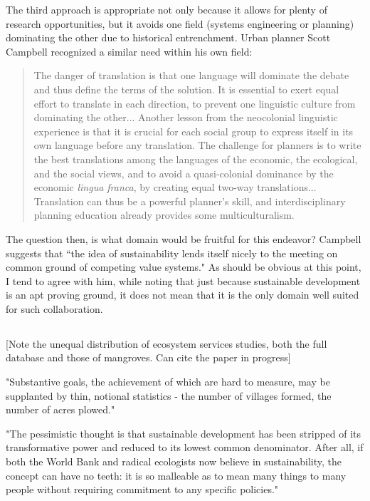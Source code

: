 The third approach is appropriate not only because it allows for plenty of research opportunities, but it avoids one field (systems engineering or planning) dominating the other due to historical entrenchment. Urban planner Scott Campbell recognized a similar need within his own field:

\blockquote{The danger of translation is that one language will dominate the debate and thus define the terms of the solution. It is essential to exert equal effort to translate in each direction, to prevent one linguistic culture from dominating the other... Another lesson from the neocolonial linguistic experience is that it is crucial for each social group to express itself in its own language before any translation. The challenge for planners is to write the best translations among the languages of the economic, the ecological, and the social views, and to avoid a quasi-colonial dominance by the economic \textit{lingua franca}, by creating equal two-way translations... Translation can thus be a powerful planner's skill, and interdisciplinary planning education already provides some multiculturalism. \cite[\textsuperscript{(p230)}]{campbellGreenCitiesGrowing2016}}

The question then, is what domain would be fruitful for this endeavor? Campbell suggests that ``the idea of sustainability lends itself nicely to the meeting on common ground of competing value systems." As should be obvious at this point, I tend to agree with him, while noting that just because sustainable development is an apt proving ground, it does not mean that it is the only domain well suited for such collaboration.

\subsection{} \label{sec:sdg_critique}

[Note the unequal distribution of ecosystem services studies, both the full database and those of mangroves. Can cite the paper in progress]

"Substantive goals, the achievement of which are hard to measure, may be supplanted by thin, notional statistics - the number of villages formed, the number of acres plowed." \cite{scottSeeingStateHow2020}


"The pessimistic thought is that sustainable development has been stripped of its transformative power and reduced to its lowest common denominator. After all, if both the World Bank and radical ecologists now believe in sustainability, the concept can have no teeth: it is so malleable as to mean many things to many people without requiring commitment to any specific policies." \cite{campbellGreenCitiesGrowing2016}

